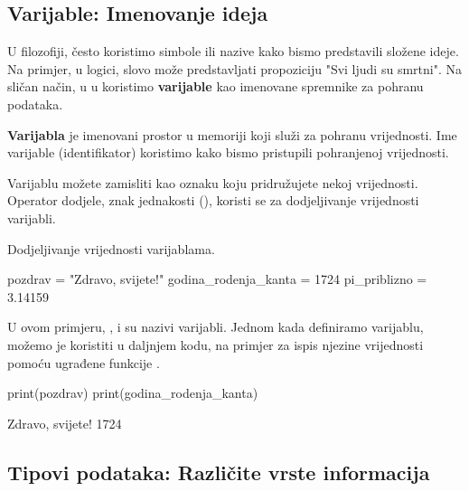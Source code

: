 \subsection{Varijable: Imenovanje ideja}

U filozofiji, često koristimo simbole ili nazive kako bismo predstavili složene ideje. Na primjer, u logici, slovo  može predstavljati propoziciju "Svi ljudi su smrtni". Na sličan način, u u koristimo \textbf{varijable} kao imenovane spremnike za pohranu podataka.

\begin{definicijaokvir}
    \textbf{Varijabla} je imenovani prostor u memoriji koji služi za pohranu vrijednosti. Ime varijable (identifikator) koristimo kako bismo pristupili pohranjenoj vrijednosti.
\end{definicijaokvir}

Varijablu možete zamisliti kao oznaku koju pridružujete nekoj vrijednosti. Operator dodjele, znak jednakosti (\pyinline{=}), koristi se za dodjeljivanje vrijednosti varijabli.

\begin{primjerokvir}
    Dodjeljivanje vrijednosti varijablama.
    \begin{pythoncode}
pozdrav = "Zdravo, svijete!"
godina_rodenja_kanta = 1724
pi_priblizno = 3.14159
    \end{pythoncode}
    U ovom primjeru, ,  i  su nazivi varijabli. Jednom kada definiramo varijablu, možemo je koristiti u daljnjem kodu, na primjer za ispis njezine vrijednosti pomoću ugrađene funkcije .
    \begin{pythoncode}
print(pozdrav)
print(godina_rodenja_kanta)
    \end{pythoncode}
    \begin{codeoutput}
Zdravo, svijete!
1724
    \end{codeoutput}
\end{primjerokvir}


\subsection{Tipovi podataka: Različite vrste informacija}

